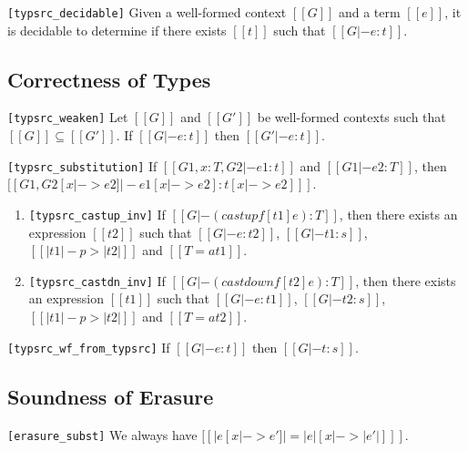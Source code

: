 \begin{lemma}
\verb|[typsrc_decidable]|
Given a well-formed context $[[G]]$ and a term $[[e]]$, it is decidable
to determine if there exists $[[t]]$ such that $[[G |- e : t]]$.
\end{lemma}

\subsection{Correctness of Types}
\begin{lemma}[Weakening]
    \verb|[typsrc_weaken]|
    Let $[[G]]$ and $[[G']]$ be well-formed contexts such that $[[G]] \subseteq
[[G']]$. If $[[G |- e : t]]$ then $[[G' |- e : t]]$.
\end{lemma}

\begin{lemma}[Substitution]
\verb|[typsrc_substitution]|
	If $[[G1, x:T, G2 |- e1:t]]$ and $[[G1 |- e2:T]]$, then $[[G1, G2 [x |-> e2]
|- e1[x |-> e2]  : t[x |-> e2] ]]$.
\end{lemma}

\begin{lemma}\label{lem:appendix:gen}
\begin{enumerate}[(1)]
	\item \verb|[typsrc_castup_inv]| If $[[G |- (castupf [t1] e):T]]$, then there exists an expression $[[t2]]$
such that $[[G |- e:t2]]$, $[[G |- t1:s]]$, $[[|t1| -p> |t2|]]$ and $[[T =a t1]]$.
	\item \verb|[typsrc_castdn_inv]| If $[[G |- (castdownf [t2] e):T]]$, then there exists an expression $[[t1]]$
such that $[[G |- e:t1]]$, $[[G |- t2:s]]$, $[[|t1| -p> |t2|]]$ and $[[T =a t2]]$.
\end{enumerate}
\end{lemma}

\begin{lemma}\label{lem:appendix:corrtyp}
\verb|[typsrc_wf_from_typsrc]|
    If $[[G |- e:t]]$ then $[[G |- t : s]]$.
\end{lemma}

\subsection{Soundness of Erasure}
\begin{lemma}
\verb|[erasure_subst]|
We always have $[[|e [x |-> e']| = |e|[x |-> |e'|] ]]$.
\end{lemma}

